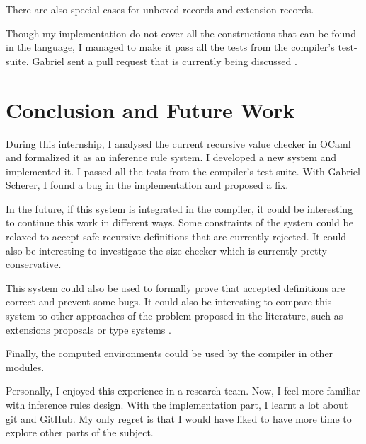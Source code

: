 \documentclass{article}
\begin{document}
There are also special cases for unboxed records and extension records.

Though my implementation do not cover all the constructions that can be found in
the language, I managed to make it pass all the tests from the compiler's
test-suite. Gabriel sent a pull request that is currently being discussed
\cite{NewSystemPullRequest}.

\section*{Conclusion and Future Work}
During this internship, I analysed the current recursive value checker in OCaml
and formalized it as an inference rule system. I developed a new system and
implemented it. I passed all the tests from the compiler's test-suite. With
Gabriel Scherer, I found a bug in the implementation and proposed a fix.

In the future, if this system is integrated in the compiler, it could be
interesting to continue this work in different ways. Some constraints of the
system could be relaxed to accept safe recursive definitions that are currently
rejected. It could also be interesting to investigate the size checker which is
currently pretty conservative.

This system could also be used to formally prove that accepted definitions are
correct and prevent some bugs. It could also be interesting to compare this
system to other approaches of the problem proposed in the literature, such as
extensions proposals \cite{jeannin2012cocaml} or type systems
\cite{dreyer2004type}.

Finally, the computed environments could be used by the compiler in other
modules.

Personally, I enjoyed this experience in a research team. Now, I feel more
familiar with inference rules design. With the implementation part, I learnt a
lot about git and GitHub. My only regret is that I would have liked to have
more time to explore other parts of the subject.



\end{document}
